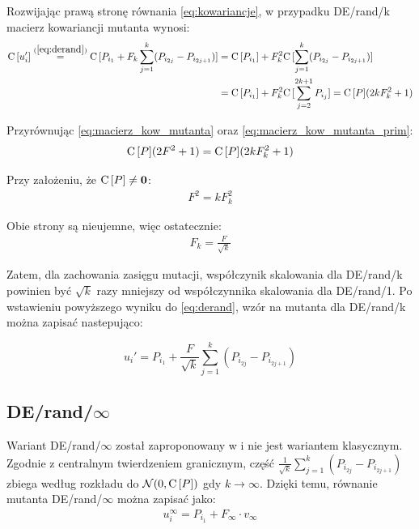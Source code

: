 \documentclass[a4paper,onecolumn,oneside,12pt,wide,floatssmall]{mwrep}
\def\C{{\rm C}\,}
\theoremstyle{definition}
\theoremstyle{plain}%
\theoremstyle{remark}
\begin{document}
Rozwijając prawą stronę równania \eqref{eq:kowariancje}, w przypadku DE/rand/k macierz kowariancji mutanta wynosi:
\begin{equation}
\begin{align}
 \label{eq:macierz_kow_mutanta_prim}
\C[u_i'] \overset{(\ref{eq:derand})}{=} \C[P_{i_1} + F_k\sum\limits_{j=1}^k (P_{i_{2j}} - P_{i_{2j+1}})] 
&= \C[P_{i_1}] + F_k^2\C[\sum\limits_{j=1}^k (P_{i_{2j}} - P_{i_{2j+1}})] \\
&= \C[P_{i_1}] + F_k^2\C[\sum\limits_{j=2}^{2k+1} P_{i_{j}}] = \C[P](2kF_k^2 + 1)
\end{align}
\end{equation}

Przyrównując \eqref{eq:macierz_kow_mutanta} oraz \eqref{eq:macierz_kow_mutanta_prim}:
\begin{align*}
\C[P](2F^2 + 1) = \C[P](2kF_k^2 + 1)
\end{align*}

Przy założeniu, że $\C[P] \neq \textbf{0}$:
\begin{align*}
F^2 = kF_k^2
\end{align*}

Obie strony są nieujemne, więc ostatecznie:
\begin{align*}
F_k = \frac{F}{\sqrt{k}}
\end{align*}

Zatem, dla zachowania zasięgu mutacji, współczynik skalowania dla DE/rand/k powinien być  
$\sqrt{k}$ razy mniejszy od współczynnika skalowania dla DE/rand/1. Po wstawieniu powyższego wyniku
do \eqref{eq:derand}, wzór na mutanta dla DE/rand/k można zapisać nastepująco:

$$ u_i' = P_{i_1} + \frac{F}{\sqrt{k}}\sum\limits_{j=1}^k (P_{i_{2j}} - P_{i_{2j+1}}) $$

\subsection{DE/rand/$\infty$}
\label{sub:de_rand_inf}

Wariant DE/rand/$\infty$ został zaproponowany w \cite{decomposition} i nie jest wariantem klasycznym.
Zgodnie z centralnym twierdzeniem granicznym, część $\frac{1}{{\sqrt{k}}}\sum\limits_{j=1}^k (P_{i_{2j}} - P_{i_{2j+1}})$ 
zbiega według rozkładu do $\mathcal{N}(0, \C[P])$ gdy $k \to \infty$. 
Dzięki temu, równanie mutanta DE/rand/$\infty$ można zapisać jako:
\begin{align*}
u_i^\infty = P_{i_1} + F_\infty \cdot v_\infty
\end{align*}
\end{document}
